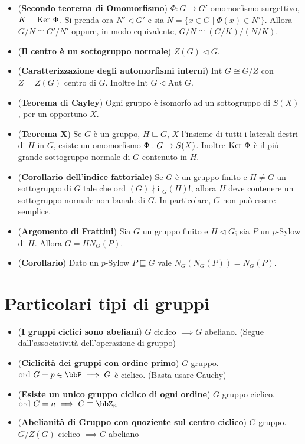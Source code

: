 \documentclass[a4paper,NoNotes,GeneralMath]{stdmdoc}
\newcommand{\Ord}{\text{ord }}
\newcommand{\sgr}{\sqsubseteq}
\newcommand{\nrm}{\lhd}
\newcommand{\Int}{\text{Int }}
\newcommand{\Ind}{\text{i }}
\newcommand{\Aut}{\text{Aut }}
\newcommand{\isom}{\equiv}
\begin{document}
\begin{itemize}
		\item ({\bf Secondo teorema di Omomorfismo}) $\Phi: G \mapsto G'$ omomorfismo surgettivo, $K = \mbox{Ker } \Phi$. Si prenda ora $N' \nrm G'$ e sia $N = \{x \in G \mid \Phi(x) \in N'\}$. Allora $G/N \cong G'/N'$ oppure, in modo equivalente, $G/N \cong (G/K)/(N/K)$.
		\item ({\bf Il centro è un sottogruppo normale}) $Z(G) \nrm G$.
		\item ({\bf Caratterizzazione degli automorfismi interni}) $\Int G \cong G/Z$ con $Z = Z(G)$ centro di $G$. Inoltre $\Int G \nrm \Aut G$.
		\item ({\bf Teorema di Cayley}) Ogni gruppo è isomorfo ad un sottogruppo di $S(X)$, per un opportuno $X$.
		\item ({\bf Teorema X}) Se $G$ è un gruppo, $H \sgr G$, $X$ l'insieme di tutti i laterali destri di $H$ in $G$, esiste un omomorfismo $\Phi: G \rightarrow S(X)$. Inoltre $\mbox{Ker } \Phi$ è il più grande sottogruppo normale di $G$ contenuto in $H$.
		\item ({\bf Corollario dell'indice fattoriale}) Se $G$ è un gruppo finito e $H \neq G$ un sottogruppo di $G$ tale che $\Ord(G) \nmid \Ind_G(H)!$, allora $H$ deve contenere un sottogruppo normale non banale di $G$. In particolare, $G$ non può essere semplice.
		\item ({\bf Argomento di Frattini}) Sia $G$ un gruppo finito e $H \nrm G$; sia $P$ un $p$-Sylow di $H$. Allora $G=H N_{G}(P)$.
		\item ({\bf Corollario}) Dato un $p$-Sylow $P \sgr G$ vale $N_{G}(N_{G}(P)) = N_{G}(P)$.
	\end{itemize}

	\section*{Particolari tipi di gruppi}
	\begin{itemize}
		\item ({\bf I gruppi ciclici sono abeliani}) $G$ ciclico $\implies G$ abeliano. (Segue dall'associatività dell'operazione di gruppo)
		\item ({\bf Ciclicità dei gruppi con ordine primo}) $G$ gruppo. $\Ord G = p \in \bbP \implies G$ è ciclico. (Basta usare Cauchy)
		\item ({\bf Esiste un unico gruppo ciclico di ogni ordine}) $G$ gruppo ciclico. $\Ord G = n \implies G \isom \bbZ_{n}$
		\item ({\bf Abelianità di Gruppo con quoziente sul centro ciclico}) $G$ gruppo. $G/Z(G)$ ciclico $\implies G$ abeliano
	\end{itemize}
\end{document}
